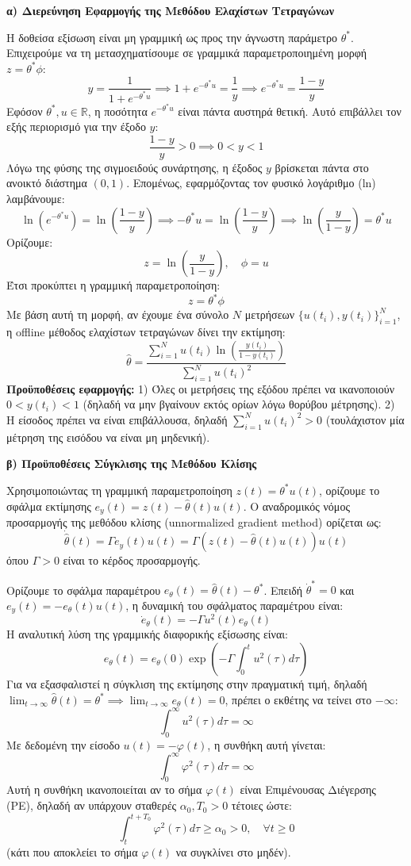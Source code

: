 \documentclass[a4paper,11pt]{article}
\begin{document}
\begin{answer}
\textbf{α) Διερεύνηση Εφαρμογής της Μεθόδου Ελαχίστων Τετραγώνων}

Η δοθείσα εξίσωση είναι μη γραμμική ως προς την άγνωστη παράμετρο $\theta^*$. Επιχειρούμε να τη μετασχηματίσουμε σε γραμμικά παραμετροποιημένη μορφή $z = \theta^* \phi$:
\[ y = \frac{1}{1 + e^{-\theta^* u}} \implies 1 + e^{-\theta^* u} = \frac{1}{y} \implies e^{-\theta^* u} = \frac{1-y}{y} \]
Εφόσον $\theta^*, u \in \mathbb{R}$, η ποσότητα $e^{-\theta^* u}$ είναι πάντα αυστηρά θετική. Αυτό επιβάλλει τον εξής περιορισμό για την έξοδο $y$:
\[ \frac{1-y}{y} > 0 \implies 0 < y < 1 \]
Λόγω της φύσης της σιγμοειδούς συνάρτησης, η έξοδος $y$ βρίσκεται πάντα στο ανοικτό διάστημα $(0,1)$. Επομένως, εφαρμόζοντας τον φυσικό λογάριθμο (ln) λαμβάνουμε:
\[ \ln\left(e^{-\theta^* u}\right) = \ln\left(\frac{1-y}{y}\right) \implies -\theta^* u = \ln\left(\frac{1-y}{y}\right) \implies \ln\left(\frac{y}{1-y}\right) = \theta^* u \]
Ορίζουμε:
\[ z = \ln\left(\frac{y}{1-y}\right), \quad \phi = u \]
Έτσι προκύπτει η γραμμική παραμετροποίηση:
\[ z = \theta^* \phi \]
Με βάση αυτή τη μορφή, αν έχουμε ένα σύνολο $N$ μετρήσεων $\{u(t_i), y(t_i)\}_{i=1}^N$, η offline μέθοδος ελαχίστων τετραγώνων δίνει την εκτίμηση:
\[ \hat{\theta} = \frac{\sum_{i=1}^N u(t_i) \ln\left(\frac{y(t_i)}{1 - y(t_i)}\right)}{\sum_{i=1}^N u(t_i)^2} \]
\textbf{Προϋποθέσεις εφαρμογής:}
1) Όλες οι μετρήσεις της εξόδου πρέπει να ικανοποιούν $0 < y(t_i) < 1$ (δηλαδή να μην βγαίνουν εκτός ορίων λόγω θορύβου μέτρησης).
2) Η είσοδος πρέπει να είναι επιβάλλουσα, δηλαδή $\sum_{i=1}^N u(t_i)^2 > 0$ (τουλάχιστον μία μέτρηση της εισόδου να είναι μη μηδενική).

\textbf{β) Προϋποθέσεις Σύγκλισης της Μεθόδου Κλίσης}

Χρησιμοποιώντας τη γραμμική παραμετροποίηση $z(t) = \theta^* u(t)$, ορίζουμε το σφάλμα εκτίμησης $e_y(t) = z(t) - \hat{\theta}(t) u(t)$.
Ο αναδρομικός νόμος προσαρμογής της μεθόδου κλίσης (unnormalized gradient method) ορίζεται ως:
\[ \dot{\hat{\theta}}(t) = \Gamma e_y(t) u(t) = \Gamma \left( z(t) - \hat{\theta}(t) u(t) \right) u(t) \]
όπου $\Gamma > 0$ είναι το κέρδος προσαρμογής.

Ορίζουμε το σφάλμα παραμέτρου $e_\theta(t) = \hat{\theta}(t) - \theta^*$. Επειδή $\dot{\theta}^* = 0$ και $e_y(t) = -e_\theta(t) u(t)$, η δυναμική του σφάλματος παραμέτρου είναι:
\[ \dot{e}_\theta(t) = -\Gamma u^2(t) e_\theta(t) \]
Η αναλυτική λύση της γραμμικής διαφορικής εξίσωσης είναι:
\[ e_\theta(t) = e_\theta(0) \exp\left( -\Gamma \int_0^t u^2(\tau) d\tau \right) \]
Για να εξασφαλιστεί η σύγκλιση της εκτίμησης στην πραγματική τιμή, δηλαδή $\lim_{t \to \infty} \hat{\theta}(t) = \theta^* \implies \lim_{t \to \infty} e_\theta(t) = 0$, πρέπει ο εκθέτης να τείνει στο $-\infty$:
\[ \int_0^\infty u^2(\tau) d\tau = \infty \]
Με δεδομένη την είσοδο $u(t) = -\varphi(t)$, η συνθήκη αυτή γίνεται:
\[ \int_0^\infty \varphi^2(\tau) d\tau = \infty \]
Αυτή η συνθήκη ικανοποιείται αν το σήμα $\varphi(t)$ είναι Επιμένουσας Διέγερσης (PE), δηλαδή αν υπάρχουν σταθερές $\alpha_0, T_0 > 0$ τέτοιες ώστε:
\[ \int_{t}^{t+T_0} \varphi^2(\tau) d\tau \ge \alpha_0 > 0, \quad \forall t \ge 0 \]
(κάτι που αποκλείει το σήμα $\varphi(t)$ να συγκλίνει στο μηδέν).
\end{answer}
\end{document}
